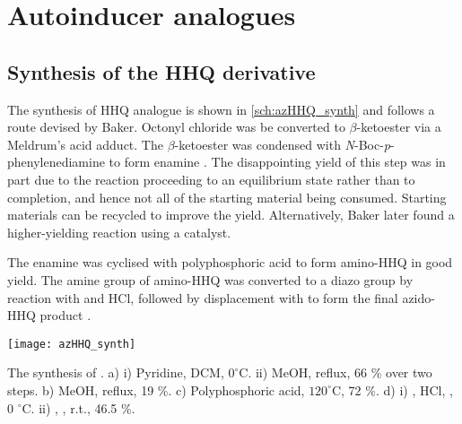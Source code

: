 \section{Autoinducer analogues}

\subsection{Synthesis of the HHQ derivative}

The synthesis of HHQ analogue  is shown in \ref{sch:azHHQ_synth} and follows a route devised by Baker\cite{Baker2015}. Octonyl chloride  was be converted to $\beta$-ketoester  via a Meldrum's acid adduct\cite{Baker2012,Scribner1978}. The $\beta$-ketoester  was condensed with \textit{N}-Boc-\textit{p}-phenylenediamine  to form enamine . The disappointing yield of this step was in part due to the reaction proceeding to an equilibrium state rather than to completion, and hence not all of the starting material being consumed. Starting materials can be recycled to improve the yield. Alternatively, Baker later found a higher-yielding reaction using a  catalyst.

The enamine  was cyclised with polyphosphoric acid to form amino-HHQ  in good yield. The amine group of amino-HHQ  was converted to a diazo group by reaction with  and HCl, followed by displacement with  to form the final azido-HHQ product \cite{Xu2013}.

\begin{scheme}[H]
	\begin{center}
		\texttt{[image: azHHQ\_synth]}
		\caption{The synthesis of . 
		a) i) Pyridine, DCM, $0 ^{\circ}$C. ii) MeOH, reflux, 66 \% over two steps. 
		b) MeOH, reflux, 19 \%. 
		c) Polyphosphoric acid, $120 ^{\circ}$C, 72 \%. 
		d) i) , HCl, , 0 $^{\circ}$C. ii) , , r.t., 46.5 \%.
		\label{sch:azHHQ_synth}}
	\end{center}
\end{scheme}

